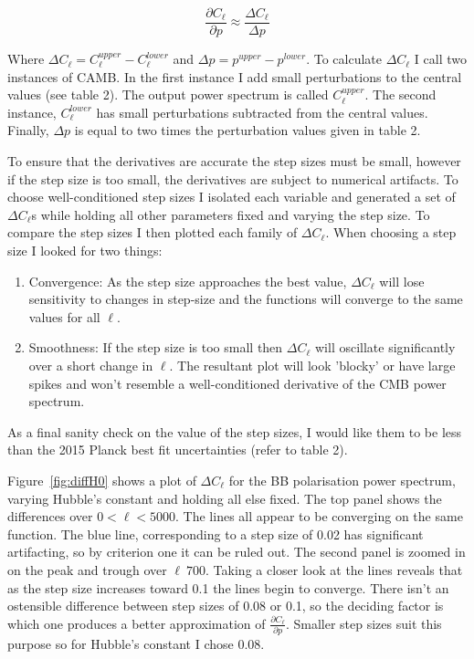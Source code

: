 \begin{equation}
\label{eqn:dcl}
\frac{\partial C_{\ell}}{\partial p} \approx \frac{\Delta C_{\ell}}{\Delta p}
\end{equation}
 
Where $\Delta C_{\ell} = C^{upper}_{\ell} - C^{lower}_{\ell}$ and $\Delta p = p^{upper} - p^{lower}$. To calculate $\Delta C_{\ell}$ I call two instances of CAMB. In the first instance I add small perturbations to the central values (see table 2). The output power spectrum is called $C^{upper}_{\ell}$. The second instance, $C^{lower}_{\ell}$ has small perturbations subtracted from the central values. Finally, $\Delta p$ is equal to two times the perturbation values given in table 2.

To ensure that the derivatives are accurate the step sizes must be small, however if the step size is too small, the derivatives are subject to numerical artifacts. To choose well-conditioned step sizes I isolated each variable and generated a set of $\Delta C_{\ell}$s while holding all other parameters fixed and varying the step size. To compare the step sizes I then plotted each family of $\Delta C_{\ell}$. When choosing a step size I looked for two things:

\begin{enumerate}
\item Convergence: As the step size approaches the best value, $\Delta C_{\ell}$ will lose sensitivity to changes in step-size and the functions will converge to the same values for all $\ell$.

\item Smoothness: If the step size is too small then $\Delta C_{\ell}$ will oscillate significantly over a short change in $\ell$. The resultant plot will look 'blocky' or have large spikes and won't resemble a well-conditioned derivative of the CMB power spectrum.
\end{enumerate}

As a final sanity check on the value of the step sizes, I would like them to be less than the 2015 Planck best fit uncertainties (refer to table 2).
 
Figure~\ref{fig:diffH0} shows a plot of $\Delta C_{\ell}$ for the BB polarisation power spectrum, varying Hubble's constant and holding all else fixed. The top panel shows the differences over $ 0 < \ell < 5000$. The lines all appear to be converging on the same function. The blue line, corresponding to a step size of 0.02 has significant artifacting, so by criterion one it can be ruled out. The second panel is zoomed in on the peak and trough over $\ell ~ 700$. Taking a closer look at the lines reveals that as the step size increases toward 0.1 the lines begin to converge. There isn't an ostensible difference between step sizes of 0.08 or 0.1, so the deciding factor is which one produces a better approximation of $\frac{\partial C_{\ell}}{\partial p}$. Smaller step sizes suit this purpose so for Hubble's constant I chose 0.08.
  
